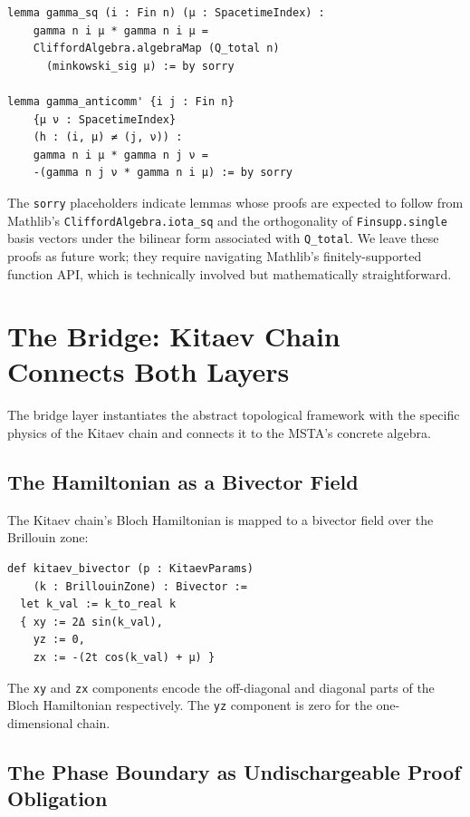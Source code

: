 \documentclass[11pt,a4paper]{article}
\newcommand{\lean}[1]{\lstinline[language=Lean4]{#1}}
\begin{document}
\begin{lstlisting}
lemma gamma_sq (i : Fin n) (μ : SpacetimeIndex) :
    gamma n i μ * gamma n i μ =
    CliffordAlgebra.algebraMap (Q_total n)
      (minkowski_sig μ) := by sorry

lemma gamma_anticomm' {i j : Fin n}
    {μ ν : SpacetimeIndex}
    (h : (i, μ) ≠ (j, ν)) :
    gamma n i μ * gamma n j ν =
    -(gamma n j ν * gamma n i μ) := by sorry
\end{lstlisting}

The \lean{sorry} placeholders indicate lemmas whose proofs are expected to follow from Mathlib's \lean{CliffordAlgebra.iota_sq} and the orthogonality of \lean{Finsupp.single} basis vectors under the bilinear form associated with \lean{Q_total}. We leave these proofs as future work; they require navigating Mathlib's finitely-supported function API, which is technically involved but mathematically straightforward.

\section{The Bridge: Kitaev Chain Connects Both Layers}
\label{sec:bridge}

The bridge layer instantiates the abstract topological framework with the specific physics of the Kitaev chain and connects it to the MSTA's concrete algebra.

\subsection{The Hamiltonian as a Bivector Field}

The Kitaev chain's Bloch Hamiltonian is mapped to a bivector field over the Brillouin zone:

\begin{lstlisting}
def kitaev_bivector (p : KitaevParams)
    (k : BrillouinZone) : Bivector :=
  let k_val := k_to_real k
  { xy := 2Δ sin(k_val),
    yz := 0,
    zx := -(2t cos(k_val) + μ) }
\end{lstlisting}

The \lean{xy} and \lean{zx} components encode the off-diagonal and diagonal parts of the Bloch Hamiltonian respectively. The \lean{yz} component is zero for the one-dimensional chain.

\subsection{The Phase Boundary as Undischargeable Proof Obligation}
\end{document}
